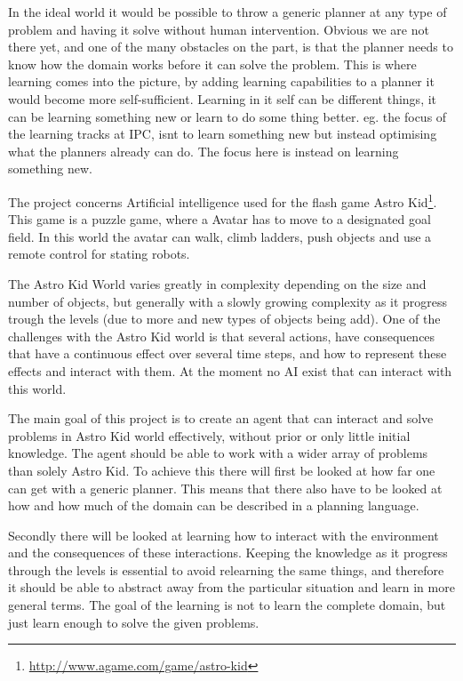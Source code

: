 	In the ideal world it would be possible to throw a generic planner at any type of problem and having it solve without human intervention. Obvious we are not there yet, and one of the many obstacles on the part, is that the planner needs to know how the domain works before it can solve the problem. This is where learning comes into the picture, by adding learning capabilities to a planner it would become more self-sufficient. Learning in it self can be different things, it can be learning something new or learn to do some thing better. eg. the focus of the learning tracks at IPC, isnt to learn something new but instead optimising what the planners already can do. The focus here is instead on learning something new. %



	The project concerns Artificial intelligence used for the flash game Astro Kid\footnote{\url{http://www.agame.com/game/astro-kid}}. This game is a puzzle game, where a Avatar has to move to a designated goal field. In this world the avatar can walk, climb ladders, push objects and use a remote control for stating robots.
	
	The Astro Kid World varies greatly in complexity depending on the size and number of objects, but generally with a slowly growing complexity as it progress trough the levels (due to more and new types of objects being add). One of the challenges with the Astro Kid world is that several actions, have consequences that have a continuous effect over several time steps, and how to represent these effects and interact with them. At the moment no AI exist that can interact with this world. 

	The main goal of this project is to create an agent that can interact and solve problems in Astro Kid world effectively, without prior or only little initial knowledge. The agent should be able to work with a wider array of problems than solely Astro Kid. To achieve this there will first be looked at how far one can get with a generic planner. This means that there also have to be looked at how and how much of the domain can be described in a planning language. 

	Secondly there will be looked at learning how to interact with the environment and the consequences of these interactions. Keeping the knowledge as it progress through the levels is essential to avoid relearning the same things, and therefore it should be able to abstract away from the particular situation and learn in more general terms. The goal of the learning is not to learn the complete domain, but just learn enough to solve the given problems.

